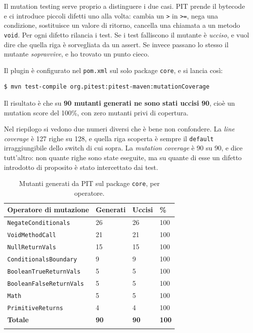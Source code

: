 Il mutation testing serve proprio a distinguere i due casi. PIT prende il bytecode e ci
introduce piccoli difetti uno alla volta: cambia un \texttt{>} in \texttt{>=}, nega una
condizione, sostituisce un valore di ritorno, cancella una chiamata a un metodo
\texttt{void}. Per ogni difetto rilancia i test. Se i test falliscono il mutante è
\emph{ucciso}, e vuol dire che quella riga è sorvegliata da un assert. Se invece passano
lo stesso il mutante \emph{sopravvive}, e ho trovato un punto cieco.

Il plugin è configurato nel \texttt{pom.xml} sul solo package \texttt{core}, e si lancia
così:

\begin{lstlisting}[style=terminal, caption={Esecuzione di PIT}]
$ mvn test-compile org.pitest:pitest-maven:mutationCoverage
\end{lstlisting}

Il risultato è che su \textbf{90 mutanti generati ne sono stati uccisi 90}, cioè un
mutation score del 100\%, con zero mutanti privi di copertura.


Nel riepilogo si vedono due numeri diversi che è bene non confondere. La \emph{line
coverage} è 127 righe su 128, e quella riga scoperta è sempre il \texttt{default}
irraggiungibile dello switch di cui sopra. La \emph{mutation coverage} è 90 su 90, e dice
tutt'altro: non quante righe sono state eseguite, ma su quante di esse un difetto
introdotto di proposito è stato intercettato dai test.

\begin{longtable}{@{}p{6.2cm}p{2cm}p{2cm}p{2cm}@{}}
\toprule
\textbf{Operatore di mutazione} & \textbf{Generati} & \textbf{Uccisi} & \textbf{\%} \\
\midrule
\endhead
\texttt{NegateConditionals} & 26 & 26 & 100 \\
\texttt{VoidMethodCall} & 21 & 21 & 100 \\
\texttt{NullReturnVals} & 15 & 15 & 100 \\
\texttt{ConditionalsBoundary} & 9 & 9 & 100 \\
\texttt{BooleanTrueReturnVals} & 5 & 5 & 100 \\
\texttt{BooleanFalseReturnVals} & 5 & 5 & 100 \\
\texttt{Math} & 5 & 5 & 100 \\
\texttt{PrimitiveReturns} & 4 & 4 & 100 \\
\midrule
\textbf{Totale} & \textbf{90} & \textbf{90} & \textbf{100} \\
\bottomrule
\caption{Mutanti generati da PIT sul package \texttt{core}, per operatore.}
\label{tab:pit}
\end{longtable}

\newpage